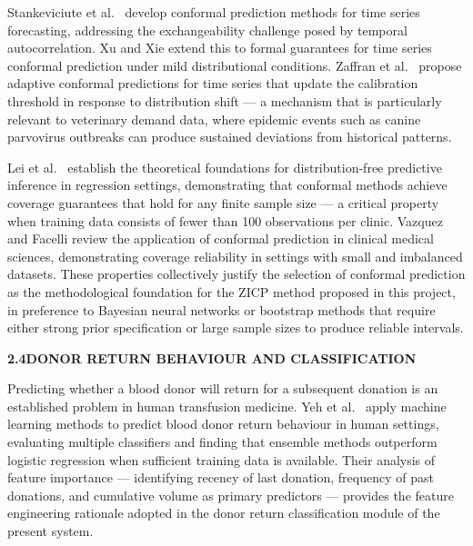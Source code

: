 \documentclass[12pt,a4paper]{article}
\begin{document}
\noindent Stankeviciute et al.\ \cite{stankeviciute2021} develop conformal prediction methods for time series forecasting, addressing the exchangeability challenge posed by temporal autocorrelation. Xu and Xie \cite{xu2023} extend this to formal guarantees for time series conformal prediction under mild distributional conditions. Zaffran et al.\ \cite{zaffran2022} propose adaptive conformal predictions for time series that update the calibration threshold in response to distribution shift — a mechanism that is particularly relevant to veterinary demand data, where epidemic events such as canine parvovirus outbreaks can produce sustained deviations from historical patterns.

\noindent Lei et al.\ \cite{lei2018} establish the theoretical foundations for distribution-free predictive inference in regression settings, demonstrating that conformal methods achieve coverage guarantees that hold for any finite sample size — a critical property when training data consists of fewer than 100 observations per clinic. Vazquez and Facelli \cite{vazquez2022} review the application of conformal prediction in clinical medical sciences, demonstrating coverage reliability in settings with small and imbalanced datasets. These properties collectively justify the selection of conformal prediction as the methodological foundation for the ZICP method proposed in this project, in preference to Bayesian neural networks or bootstrap methods that require either strong prior specification or large sample sizes to produce reliable intervals.

\vspace{1.5em}
\noindent\textbf{2.4\quad DONOR RETURN BEHAVIOUR AND CLASSIFICATION}
\vspace{0.6em}

\noindent Predicting whether a blood donor will return for a subsequent donation is an established problem in human transfusion medicine. Yeh et al.\ \cite{yeh2025} apply machine learning methods to predict blood donor return behaviour in human settings, evaluating multiple classifiers and finding that ensemble methods outperform logistic regression when sufficient training data is available. Their analysis of feature importance — identifying recency of last donation, frequency of past donations, and cumulative volume as primary predictors — provides the feature engineering rationale adopted in the donor return classification module of the present system.
\end{document}
